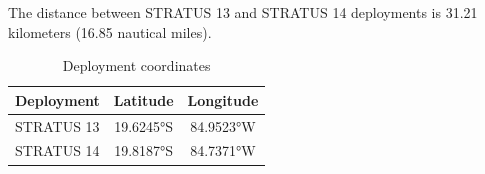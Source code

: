 
The distance between STRATUS 13 and STRATUS 14 deployments is 31.21 kilometers (16.85 nautical miles).

\begin{table}[ht]
\centering
\caption{Deployment coordinates}
\begin{tabular}{lcc}
\hline
\textbf{Deployment} & \textbf{Latitude} & \textbf{Longitude} \\
\hline
STRATUS 13 & 19.6245°S & 84.9523°W \\
STRATUS 14 & 19.8187°S & 84.7371°W \\
\hline
\end{tabular}
\end{table}
